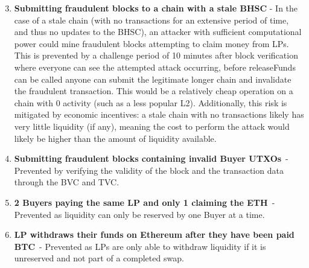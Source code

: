 \documentclass[
]{article}
\providecommand{\tightlist}{%
  \setlength{\itemsep}{0pt}\setlength{\parskip}{0pt}}
\begin{document}
{{{}

\begin{enumerate}
\setcounter{enumi}{2}
\tightlist
\item
  \textbf{Submitting fraudulent blocks to a chain with a stale BHSC}{ - In
  the case of a stale chain (with no transactions for an extensive
  period of time, and thus no updates to the BHSC), an attacker with
  sufficient computational power could mine fraudulent blocks attempting
  to claim money from LPs. This is prevented by a challenge period of 10
  minutes after block verification where everyone can see the attempted
  attack occurring, before releaseFunds can be called anyone can submit
  the legitimate longer chain and invalidate the fraudulent transaction.
  This would be a relatively cheap operation on a chain with 0 activity
  (such as a less popular L2). Additionally, this risk is mitigated by
  economic incentives: a stale chain with no transactions likely has
  very little liquidity (if any), meaning the cost to perform the attack
  would likely be higher than the amount of liquidity available.}
\end{enumerate}

{}

\begin{enumerate}
\setcounter{enumi}{3}
\tightlist
\item
  \textbf{Submitting fraudulent blocks containing invalid Buyer UTXOs}{~-
  Prevented by verifying the validity of the block and the transaction
  data through the BVC and TVC.}
\end{enumerate}

{}

\begin{enumerate}
\setcounter{enumi}{4}
\tightlist
\item
  \textbf{2 Buyers paying the same LP and only 1 claiming the ETH}{~- Prevented
  as liquidity can only be reserved by one Buyer at a time.}
\end{enumerate}

{}

\begin{enumerate}
\setcounter{enumi}{5}
\tightlist
\item
  \textbf{LP withdraws their funds on Ethereum after they have been paid
  BTC}{~- Prevented as LPs are only able to withdraw liquidity if it is
  unreserved and not part of a completed swap.~~~~~~~~}
\end{enumerate}

{}

}}
\end{document}
